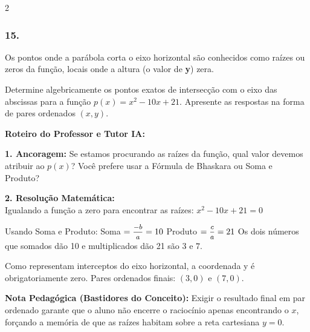 \begin{multicols*}{2}
\subsubsection*{15.} 
\begin{enunciadoLiteral}
Os pontos onde a parábola corta o eixo horizontal são conhecidos como raízes ou zeros da função, locais onde a altura (o valor de \textbf{y}) zera.

Determine algebricamente os pontos exatos de intersecção com o eixo das abscissas para a função $p(x) = x^2 - 10x + 21$. Apresente as respostas na forma de pares ordenados $(x, y)$.
\end{enunciadoLiteral}

\ifgabarito
    \begin{tcolorbox}[colback=CorTitUm!5, colframe=CorTitUm, boxrule=1pt, arc=4pt, left=6pt, right=6pt, top=6pt, bottom=6pt]
    \small\textbf{\textcolor{CorTitUm}{Roteiro do Professor e Tutor IA:}}\par\vspace{0.1cm}
    \color{CinzaEscuro}
    \textbf{1. Ancoragem:} Se estamos procurando as raízes da função, qual valor devemos atribuir ao $p(x)$? Você prefere usar a Fórmula de Bhaskara ou Soma e Produto?\par\vspace{0.1cm}
    \textbf{2. Resolução Matemática:}\\
    Igualando a função a zero para encontrar as raízes:
    $x^2 - 10x + 21 = 0$
    
    Usando Soma e Produto:
    Soma $= \mfrac{-b}{a} = 10$
    Produto $= \mfrac{c}{a} = 21$
    Os dois números que somados dão 10 e multiplicados dão 21 são $3$ e $7$.
    
    Como representam interceptos do eixo horizontal, a coordenada y é obrigatoriamente zero.
    Pares ordenados finais: $(3, 0)$ e $(7, 0)$.
    \end{tcolorbox}
    \vspace{0.15cm}
    
    \begin{boxexplicacao}
    \textbf{Nota Pedagógica (Bastidores do Conceito):} Exigir o resultado final em par ordenado garante que o aluno não encerre o raciocínio apenas encontrando o $x$, forçando a memória de que as raízes habitam sobre a reta cartesiana $y=0$.
    \end{boxexplicacao}
\fi

\par\vspace{\espacoQuestao}


\end{multicols*}
